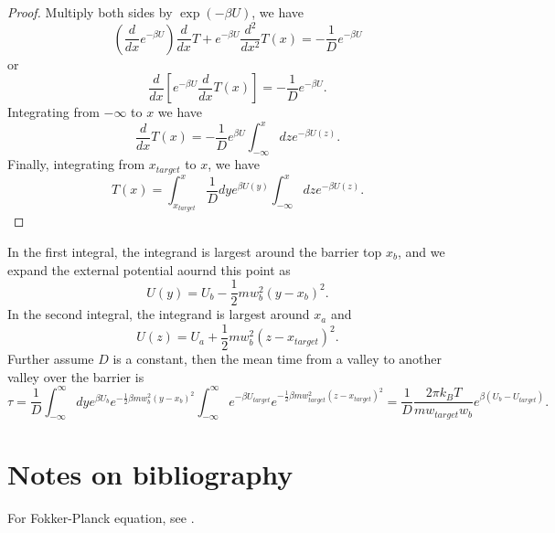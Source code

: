 \begin{refsection}
\begin{proof}
Multiply both sides by $\exp(-\beta U)$, we have
$$(\frac{d}{dx}e^{-\beta U}) \frac{d}{dx} T + e^{-\beta U}\frac{d^2}{dx^2}T(x) = -\frac{1}{D}e^{-\beta U}$$
or
$$\frac{d}{dx}[e^{-\beta U} \frac{d}{dx}T(x)] = -\frac{1}{D}e^{-\beta U}.$$
Integrating from $-\infty $ to $x$ we have
$$\frac{d}{dx}T(x) = -\frac{1}{D}e^{\beta U}\int_{-\infty}^{x}dz e^{-\beta U(z)}.$$
Finally, integrating from $x_{target}$ to $x$, we have
$$T(x) = \int_{x_{target}}^x\frac{1}{D}dy e^{\beta U(y)}\int_{-\infty}^{x}dz e^{-\beta U(z)}.$$
\end{proof}


\begin{remark}
In the first integral, the integrand is largest around the barrier top $x_b$, and we expand the external potential aournd this point as
$$U(y) = U_b-\frac{1}{2}mw_b^2(y-x_b)^2.$$
In the second integral, the integrand is largest around $x_a$ and 
$$U(z) = U_a + \frac{1}{2}m w_b^2(z-x_{target})^2.$$
Further assume $D$ is a constant, then the mean time from a valley to another valley over the barrier is
$$\tau = \frac{1}{D}\int_{-\infty}^{\infty} dy e^{\beta U_b}e^{-\frac{1}{2}\beta m w_b^2(y-x_b)^2}\int_{-\infty}^{\infty}e^{-\beta U_{target}} e^{-\frac{1}{2}\beta m w_{target}^2(z-x_{target})^2} = \frac{1}{D}\frac{2\pi k_BT}{m w_{target}w_b}e^{\beta(U_b-U_{target})}.$$
\end{remark}




\section{Notes on bibliography}


For Fokker-Planck equation, see \cite{risken2012fokker}\cite{gardiner2009stochastic}.

\printbibliography
\end{refsection}




